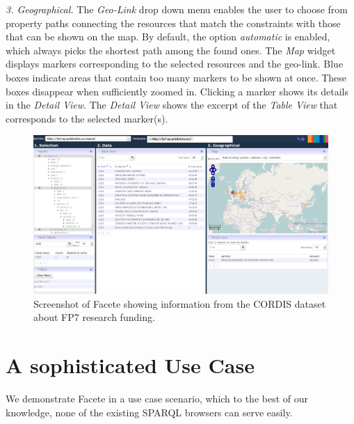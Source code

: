 \emph{3. Geographical.}
The \emph{Geo-Link} drop down menu enables the user to choose from
  property paths connecting the resources that match the constraints with those
  that can be shown on the map. By default, the option \emph{automatic} is
  enabled, which always picks the shortest path among the found ones.
The \emph{Map} widget displays markers corresponding to the
  selected resources and the geo-link. Blue boxes indicate areas that contain
  too many markers to be shown at once. These boxes disappear when
  sufficiently zoomed in. Clicking a marker shows its details in the
  \emph{Detail View}.
The \emph{Detail View} shows the excerpt of the \emph{Table View} that
  corresponds to the selected marker(s).

\begin{figure}[t]
\centering
\includegraphics[width=\textwidth]{images/2013-12-19-odp-facete-2.png}
\caption{Screenshot of Facete showing information from the CORDIS dataset about FP7 research funding.}
\label{fig:facete-screenshot}
\end{figure}


\section{A sophisticated Use Case}
\label{sec:use-case}
We demonstrate Facete in a use case scenario, which
to the best of our knowledge, none of the existing SPARQL browsers can serve
easily.


